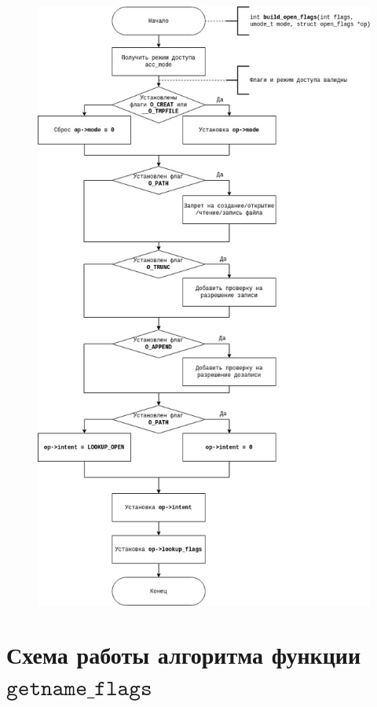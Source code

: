 \documentclass[12pt]{report}
\begin{document}
\begin{figure}[H]
	\centering
	\includegraphics[scale=0.5]{img/build_open_flags.jpg}
	\label{fig:open_open_flags}
\end{figure}

\section{Схема работы алгоритма функции $\texttt{getname\_flags}$}
\end{document}
